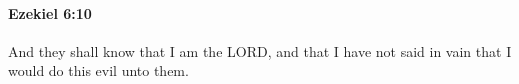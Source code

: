 
		\paragraph{Ezekiel 6:10} %
			\label{EZEKIEL-6-10}

			And they shall know that I am the LORD, and that I have not said in vain that I would do this evil unto them.


